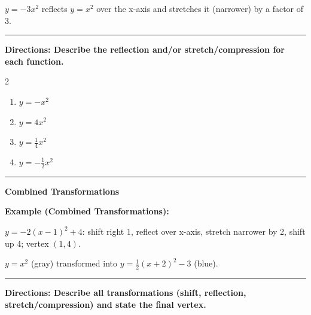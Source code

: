 \documentclass[12pt]{article}
\begin{document}
$y=-3x^2$ reflects $y=x^2$ over the x-axis and stretches it (narrower) by a factor of 3.

\vspace{0.2cm}\hrule\vspace{0.35cm}
\textbf{Directions: Describe the reflection and/or stretch/compression for each function.}

\begin{multicols}{2}
\begin{enumerate}[label=\textbf{\arabic*.}, start=5, itemsep=2cm]
  \item $\displaystyle y=-x^2$
  \item $\displaystyle y=4x^2$
  \item $\displaystyle y=\frac{1}{4}x^2$
  \item $\displaystyle y=-\frac{1}{2}x^2$
\end{enumerate}
\end{multicols}
\vspace{0.25cm}\hrule\vspace{0.35cm}

\begin{center}{\Large \textbf{Combined Transformations}}\end{center}\vspace{0.2cm}
\textbf{Example (Combined Transformations):}

$y=-2(x-1)^2+4$: shift right 1, reflect over x-axis, stretch narrower by 2, shift up 4; vertex $(1,4)$.

\begin{center}\end{center}
{\small\centering $y=x^2$ (gray) transformed into $y=\frac{1}{2}(x+2)^2-3$ (blue).\par}
\vspace{0.2cm}\hrule\vspace{0.35cm}
\textbf{Directions: Describe all transformations (shift, reflection, stretch/compression) and state the final vertex.}
\end{document}
